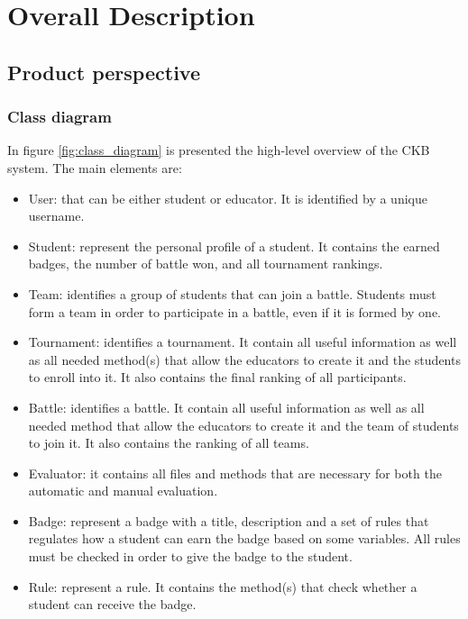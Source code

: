 \chapter{Overall Description}

\section{Product perspective}
\subsection{Class diagram}
In figure \ref{fig:class_diagram} is presented the high-level overview of the CKB system. \newline
The main elements are:
\begin{itemize}
    \item User: that can be either student or educator. It is identified by a unique username.
    \item Student: represent the personal profile of a student. It contains the earned badges, the number of battle won, and all tournament rankings.
    \item Team: identifies a group of students that can join a battle. Students must form a team in order to participate in a battle, even if it is formed by one.
    \item Tournament: identifies a tournament. It contain all useful information as well as all needed method(s) that allow the educators to create it and the students to enroll into it. It also contains the final ranking of all participants.
    \item Battle: identifies a battle. It contain all useful information as well as all needed method that allow the educators to create it and the team of students to join it. It also contains the ranking of all teams.
    \item Evaluator: it contains all files and methods that are necessary for both the automatic and manual evaluation.
    \item Badge: represent a badge with a title, description and a set of rules that regulates how a student can earn the badge based on some variables. All rules must be checked in order to give the badge to the student.
    \item Rule: represent a rule. It contains the method(s) that check whether a student can receive the badge.
\end{itemize}

